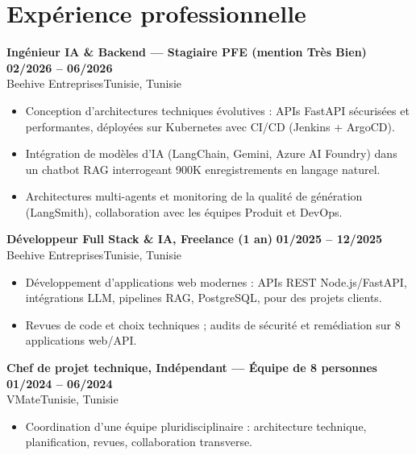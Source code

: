 \documentclass[a4paper,9pt]{article}
\newcommand{\cventry}[4]{\textbf{#1} \hfill \textbf{#4}\\[0.2pt]#2{\ifx\relax#3\relax\else, #3\fi}\par\vspace{0.3pt}}
\begin{document}
\section{Expérience professionnelle}
\cventry{Ingénieur IA \& Backend --- Stagiaire PFE (mention Très Bien)}{Beehive Entreprises}{Tunisie}{02/2026 -- 06/2026}
\begin{itemize}
  \item Conception d'architectures techniques évolutives : APIs FastAPI sécurisées et performantes, déployées sur Kubernetes avec CI/CD (Jenkins + ArgoCD).
  \item Intégration de modèles d'IA (LangChain, Gemini, Azure AI Foundry) dans un chatbot RAG interrogeant 900K enregistrements en langage naturel.
  \item Architectures multi-agents et monitoring de la qualité de génération (LangSmith), collaboration avec les équipes Produit et DevOps.
\end{itemize}
\cventry{Développeur Full Stack \& IA, Freelance (1 an)}{Beehive Entreprises}{Tunisie}{01/2025 -- 12/2025}
\begin{itemize}
  \item Développement d'applications web modernes : APIs REST Node.js/FastAPI, intégrations LLM, pipelines RAG, PostgreSQL, pour des projets clients.
  \item Revues de code et choix techniques ; audits de sécurité et remédiation sur 8 applications web/API.
\end{itemize}
\cventry{Chef de projet technique, Indépendant --- Équipe de 8 personnes}{VMate}{Tunisie}{01/2024 -- 06/2024}
\begin{itemize}
  \item Coordination d'une équipe pluridisciplinaire : architecture technique, planification, revues, collaboration transverse.
\end{itemize}
\end{document}
